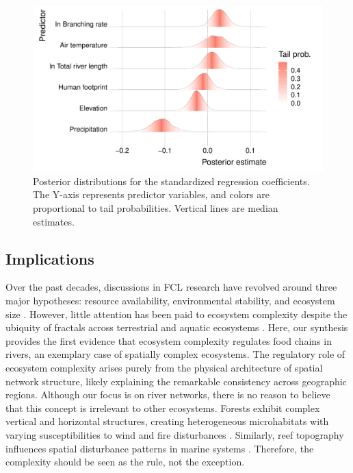 \documentclass[11pt, class=article, crop=false]{standalone}
\begin{document}
\begin{figure}
    \centering
    \includegraphics[width=0.75\linewidth]{data_fmt/fig_emp_ridge.pdf}
    \caption{Posterior distributions for the standardized regression coefficients. The Y-axis represents predictor variables, and colors are proportional to tail probabilities. Vertical lines are median estimates.}
    \label{fig:ridge}
\end{figure}

\subsection{Implications}

Over the past decades, discussions in FCL research have revolved around three major hypotheses: resource availability, environmental stability, and ecosystem size \citep{oksanen_exploitation_1981, pimm_number_1977, schoener_food_1989}.
However, little attention has been paid to ecosystem complexity despite the ubiquity of fractals across terrestrial \citep{turner_landscape_2015} and aquatic ecosystems \citep{rodriguez-iturbe_fractal_2001}.
Here, our synthesis provides the first evidence that ecosystem complexity regulates food chains in rivers, an exemplary case of spatially complex ecosystems.
The regulatory role of ecosystem complexity arises purely from the physical architecture of spatial network structure, likely explaining the remarkable consistency across geographic regions.
Although our focus is on river networks, there is no reason to believe that this concept is irrelevant to other ecosystems.
Forests exhibit complex vertical and horizontal structures, creating heterogeneous microhabitats with varying susceptibilities to wind and fire disturbances \citep{peterson_contagious_2002, cansler_climate_2014}.
Similarly, reef topography influences spatial disturbance patterns in marine systems \citep{connell_30year_1997}.
Therefore, the complexity should be seen as the rule, not the exception.
\end{document}
